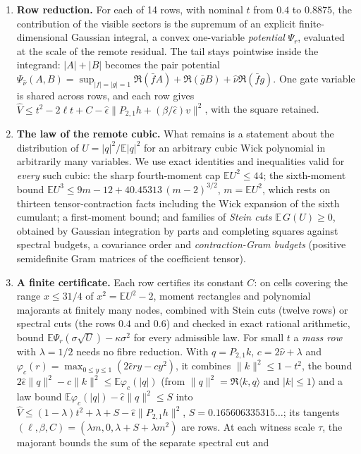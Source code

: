 \documentclass[11pt,a4paper]{article}
\newcommand{\E}{\mathbb{E}}
\begin{document}
\begin{enumerate}
\item \textbf{Row reduction.} For each of 14 rows, with nominal $t$ from $0.4$ to $0.8875$, the contribution of the
 visible sectors is the supremum of an explicit finite-dimensional Gaussian integral, a convex one-variable
 \emph{potential} $\Psi_r$, evaluated at the scale of the remote residual. The tail stays pointwise inside the integrand:
 $|A|+|B|$ becomes the pair potential $\Psi_{\hat\nu}(A,B)=\sup_{|f|=|g|=1}\Re(\bar fA)+\Re(\bar gB)+\hat\nu\Re(\bar fg)$.
 One gate variable is shared across rows, and each row gives
 $\hat V\le t^2-2\ell t+C-\hat\epsilon\|P_{2,1}h+(\beta/\hat\epsilon)v\|^2$, with the square retained.
\item \textbf{The law of the remote cubic.} What remains is a statement about the distribution of $U=|q|^2/\E|q|^2$ for an
 arbitrary cubic Wick polynomial in arbitrarily many variables. We use exact identities and inequalities valid for
 \emph{every} such cubic: the sharp fourth-moment cap $\E U^2\le44$; the sixth-moment bound
 $\E U^3\le9m-12+40.45313\,(m-2)^{3/2}$, $m=\E U^2$, which rests on thirteen tensor-contraction facts including the Wick
 expansion of the sixth cumulant; a first-moment bound; and families of \emph{Stein cuts}
 $\E\,G(U)\ge0$, obtained by Gaussian integration by parts and completing squares against spectral budgets, a covariance
 order and \emph{contraction-Gram budgets} (positive semidefinite Gram matrices of the coefficient tensor).
\item \textbf{A finite certificate.} Each row certifies its constant $C$: on cells covering the range $x\le31/4$ of
 $x^2=\E U^2-2$, moment rectangles and polynomial majorants at finitely many nodes, combined with Stein cuts (twelve
 rows) or spectral cuts (the rows $0.4$ and $0.6$) and checked in exact rational arithmetic, bound
 $\E\Psi_r(\sigma\sqrt U)-\kappa\sigma^2$ for every admissible law. For small $t$ a \emph{mass row} with $\lambda=1/2$
 needs no fibre reduction. With $q=P_{2,1}k$, $c=2\hat\nu+\lambda$ and $\varphi_c(r)=\max_{0\le y\le1}(2\hat\epsilon ry-cy^2)$,
 it combines $\|k\|^2\le1-t^2$, the bound $2\hat\epsilon\|q\|^2-c\|k\|^2\le\E\varphi_c(|q|)$ (from
 $\|q\|^2=\Re\langle k,q\rangle$ and $|k|\le1$) and a law bound
 $\E\varphi_c(|q|)-\hat\epsilon\|q\|^2\le S$ into
 $\hat V\le(1-\lambda)t^2+\lambda+S-\hat\epsilon\|P_{2,1}h\|^2$, $S=0.165606335315\ldots$; its tangents
 $(\ell,\beta,C)=(\lambda m,0,\lambda+S+\lambda m^2)$ are rows. At each witness scale $\tau$, the majorant bounds the sum of the separate spectral cut and

\end{enumerate}
\end{document}
